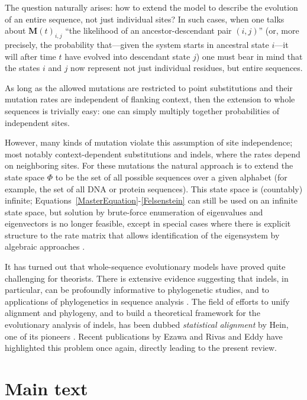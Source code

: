 \documentclass{bmcart}
\newcommand{\matr}[1]{\mathbf{#1}}
\newcommand{\statespace}{\Phi}
\newcommand{\condmatrix}{\matr{M}}
\begin{document}
The question naturally arises: how to extend the model to describe the evolution of an entire sequence,
not just individual sites?
In such cases, when one talks about $\condmatrix(t)_{i,j}$ ``the likelihood of an ancestor-descendant pair $(i,j)$''
(or, more precisely, the probability that---given the system starts in ancestral state $i$---it will after time $t$ have evolved into descendant state $j$)
one must bear in mind that the states $i$ and $j$ now represent not just individual residues, but entire sequences.

As long as the allowed mutations are restricted to point substitutions
and their mutation rates are independent of flanking context,
then the extension to whole sequences is trivially easy:
one can simply multiply together probabilities of independent sites.

However, many kinds of mutation violate this assumption of site independence;
most notably context-dependent substitutions and indels, where the rates depend on neighboring sites.
For these mutations the natural approach is to extend the state space $\statespace$
to be the set of all possible sequences over a given alphabet
(for example, the set of all DNA or protein sequences).
This state space is (countably) infinite;
Equations~\ref{MasterEquation}-\ref{Felsenstein} can still be used
on an infinite state space,
but solution by brute-force enumeration of eigenvalues and eigenvectors is no longer feasible,
except in special cases where there is explicit structure to the rate matrix that allows identification of the eigensystem by algebraic approaches
\cite{LunterHein04,pmid21827770}.

It has turned out that whole-sequence evolutionary models have proved quite challenging for theorists.
There is extensive evidence suggesting that indels, in particular, can be profoundly informative to phylogenetic studies,
and to applications of phylogenetics in sequence analysis \cite{pmid8445636,ChangBenner2004,pmid18578882,pmid23475937,pmid19958081,pmid16354754}.
The field of efforts to unify alignment and phylogeny,
and to build a theoretical framework for the evolutionary analysis of indels,
has been dubbed
{\em statistical alignment} by Hein, one of its pioneers \cite{HeinEtal2000}.
Recent publications by Ezawa \cite{Ezawa2016b,Ezawa2016a,Ezawa2016bErratum} and Rivas and Eddy \cite{RivasEddy2015} have highlighted this problem once again, directly leading to the present review.

\section*{Main text}
\end{document}
